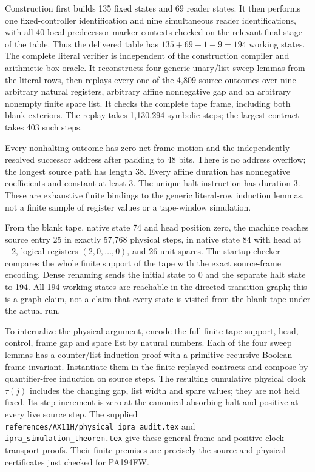 Construction first builds 135 fixed states and 69 reader states.  It
then performs one fixed-controller identification and nine simultaneous
reader identifications, with all 40 local predecessor-marker contexts
checked on the relevant final stage of the table.  Thus the delivered
table has $135+69-1-9=194$ working states.  The complete literal
verifier is independent of the construction compiler and arithmetic-box
oracle.  It reconstructs four generic unary/list sweep lemmas from the
literal rows, then replays every one of the 4,809 source outcomes over
nine arbitrary natural registers, arbitrary affine nonnegative gap and
an arbitrary nonempty finite spare list.  It checks the complete tape
frame, including both blank exteriors.  The replay takes 1,130,294
symbolic steps; the largest contract takes 403 such steps.

Every nonhalting outcome has zero net frame motion and the independently
resolved successor address after padding to 48 bits.  There is no
address overflow; the longest source path has length 38.  Every affine
duration has nonnegative coefficients and constant at least 3.  The
unique halt instruction has duration 3.  These are exhaustive finite
bindings to the generic literal-row induction lemmas, not a finite
sample of register values or a tape-window simulation.

From the blank tape, native state 74 and head position zero, the machine
reaches source entry 25 in exactly 57,768 physical steps, in native
state 84 with head at $-2$, logical registers $(2,0,\ldots,0)$, and 26
unit spares.  The startup checker compares the whole finite support of
the tape with the exact source-frame encoding.  Dense renaming sends
the initial state to 0 and the separate halt state to 194.  All 194
working states are reachable in the directed transition graph; this is
a graph claim, not a claim that every state is visited from the blank
tape under the actual run.

To internalize the physical argument, encode the full finite tape
support, head, control, frame gap and spare list by natural numbers.
Each of the four sweep lemmas has a counter/list induction proof with
a primitive recursive Boolean frame invariant.  Instantiate them in
the finite replayed contracts and compose by quantifier-free induction
on source steps.  The resulting cumulative physical clock $\tau(j)$
includes the changing gap, list width and spare values; they are not
held fixed.  Its step increment is zero at the canonical absorbing halt and positive
at every live source step.  The supplied
\texttt{references/AX11H/physical\_ipra\_audit.tex} and
\texttt{ipra\_simulation\_theorem.tex} give these general frame and
positive-clock transport proofs.  Their finite premises are precisely
the source and physical certificates just checked for PA194FW.

